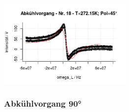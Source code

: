 \documentclass[12pt]{article}
\begin{document}
\begin{minipage}[h!]{\textwidth}
{		\includegraphics[width=0.49\textwidth]{figures/cold45-18.png}\vskip -10pt}
\end{minipage}


\subsubsection{Abkühlvorgang 90°}
\end{document}
